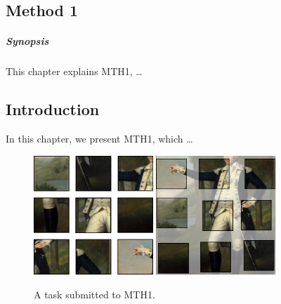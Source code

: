 \begin{fullwidth}
\chapter[METHOD 1]{Method 1}
\label{chap:mth1}
\end{fullwidth}


\paragraph{Synopsis}
This chapter explains MTH1, …


\section{Introduction}
\label{sec:mth1:intro}

In this chapter, we present MTH1, which …

\begin{figure}
    \centering
    \subfloat{\qquad}
    \includegraphics[width=0.4\textwidth]{30-part1/img/intro1.png}
    \hfill
    \subfloat{\qquad}
    \includegraphics[width=0.4\textwidth]{30-part1/img/intro2.png}
    \caption[A task submitted to MTH1]{A task submitted to MTH1.}
    \label{fig:mth1:task}
\end{figure}


